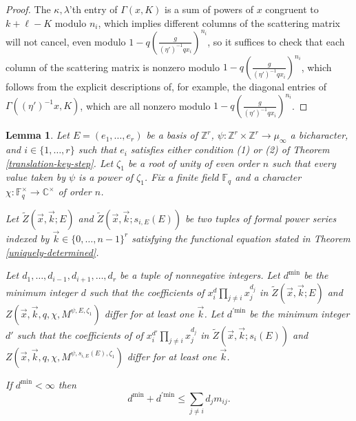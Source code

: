 \documentclass[11pt,letterpaper]{article}
\newtheorem{lemma}[theorem]{Lemma}
\theoremstyle{definition}
\theoremstyle{remark}
\numberwithin{equation}{section}
\theoremstyle{dotless}
\newcommand{\hchi}{\psi} %
\newcommand{\gene}{\zeta_1} %
\renewcommand{\tilde}{\widetilde}
\begin{document}
\begin{proof}
The $\kappa,\lambda$'th entry of $\Gamma(x,K)$ is a sum of powers of $x$ congruent to $k +\ell-K$ modulo $n_i$, which implies different columns of the scattering matrix will not cancel, even modulo $1 - q\left( \frac{g }{(\eta')^{-1} qx_i}\right)^{n_i}$, so it suffices to check that each column of the scattering matrix is nonzero modulo $1 - q\left( \frac{g }{(\eta')^{-1} qx_i}\right)^{n_i}$, which follows from the explicit descriptions of, for example, the diagonal entries of $\Gamma((\eta')^{-1} x,K)$, which are all nonzero modulo $1 - q\left( \frac{g }{(\eta')^{-1}qx_i}\right)^{n_i}$.\end{proof} 


\begin{lemma}\label{uniquely-determined-step} Let $E= (e_1,\dots, e_r)$ be a basis of $\mathbb Z^r$, $\hchi\colon \mathbb Z^r \times \mathbb Z^r \to \mu_\infty$ a bicharacter, and $i \in \{1,\dots, r\}$ such that $e_i$ satisfies either condition (1) or (2) of Theorem \ref{translation-key-step}. Let $\gene$ be a root of unity of even order $n$ such that every value taken by $\psi$ is a power of $\gene$. Fix a finite field $\mathbb F_q$ and a character $\chi \colon \mathbb F_q^\times \to \mathbb C^\times$ of order $n$.

Let $\tilde{Z} (\vec{x}, \vec{k}; E) $ and $\tilde{Z} (\vec{x}, \vec{k}; s_{i,E}(E))$ be two tuples of formal power series indexed by $\vec{k} \in \{0,\dots, n-1\}^r$ satisfying the functional equation stated in Theorem \ref{uniquely-determined}.


Let $d_1,\dots, d_{i-1}, d_{i+1} ,\dots, d_r$ be a tuple of nonnegative integers. Let $d^{\mathrm{min}}$ be the minimum integer $d$ such that the coefficients of $x_i^d \prod_{j \neq i}  x_j^{d_j}$ in $\tilde{Z} (\vec{x}, \vec{k}; E) $ and $Z(\vec{x}, \vec{k} ,q, \chi, M^{\hchi,E,\gene})$ differ for at least one $\vec{k}$. Let $d^{'\mathrm{min}}$ be the minimum integer $d'$ such that the coefficients of  of $x_i^{d'} \prod_{j \neq i}  x_j^{d_j}$ in $\tilde{Z} (\vec{x}, \vec{k}; s_i(E) ) $ and $Z(\vec{x}, \vec{k} ,q, \chi, M^{\hchi,s_{i,E}(E),\gene})$ differ for at least one $\vec{k}$. 

If $d^{\mathrm{min}}<\infty$ then \begin{equation} \label{di-bound} d^{\mathrm{min}}+d^{'\mathrm{min}} \leq \sum_{j\neq i }  d_j m_{ij}.\end{equation}
\end{lemma}
\end{document}
